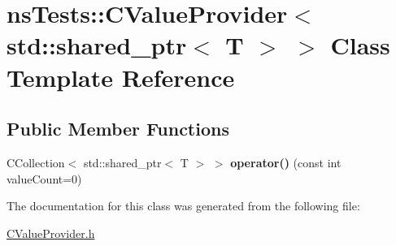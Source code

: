 \hypertarget{classnsTests_1_1CValueProvider_3_01std_1_1shared__ptr_3_01T_01_4_01_4}{\section{ns\+Tests\+:\+:C\+Value\+Provider$<$ std\+:\+:shared\+\_\+ptr$<$ T $>$ $>$ Class Template Reference}
\label{classnsTests_1_1CValueProvider_3_01std_1_1shared__ptr_3_01T_01_4_01_4}
}
\subsection*{Public Member Functions}
\begin{DoxyCompactItemize}
\item 
\hypertarget{classnsTests_1_1CValueProvider_3_01std_1_1shared__ptr_3_01T_01_4_01_4_aff143cecb064a504cf828ab46109fb68}{C\+Collection$<$ std\+::shared\+\_\+ptr$<$ T $>$ $>$ {\bfseries operator()} (const int value\+Count=0)}\label{classnsTests_1_1CValueProvider_3_01std_1_1shared__ptr_3_01T_01_4_01_4_aff143cecb064a504cf828ab46109fb68}

\end{DoxyCompactItemize}


The documentation for this class was generated from the following file\+:\begin{DoxyCompactItemize}
\item 
\hyperlink{CValueProvider_8h}{C\+Value\+Provider.\+h}\end{DoxyCompactItemize}
